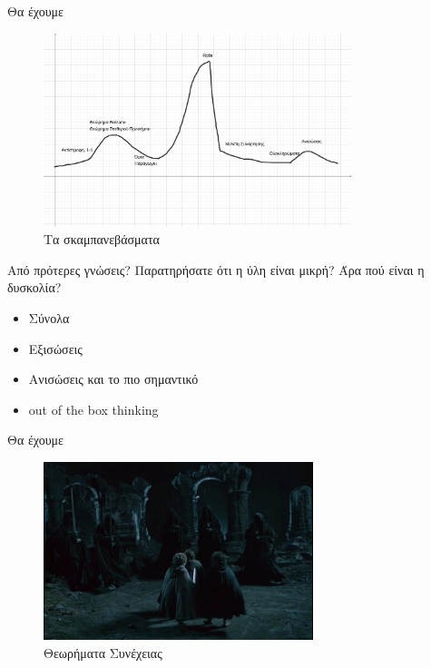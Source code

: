 \documentclass{presentation}
\begin{document}
\begin{frame}{Θα έχουμε}
      \begin{figure}
            \centering
            \includegraphics[width=0.8\textwidth]{"images/difficulty"}
            \caption{Τα σκαμπανεβάσματα}
      \end{figure}
\end{frame}

\begin{frame}{Από πρότερες γνώσεις?}
      Παρατηρήσατε ότι η ύλη είναι μικρή? Άρα πού είναι η δυσκολία?
      \begin{itemize}
            \item Σύνολα
            \item Εξισώσεις
            \item Ανισώσεις \pause και το πιο σημαντικό \pause
            \item out of the box thinking
      \end{itemize}
\end{frame}

\begin{frame}{Θα έχουμε}
      \begin{figure}
            \centering
            \includegraphics[width=0.7\textwidth]{"images/weathertop"}
            \caption{Θεωρήματα Συνέχειας}
      \end{figure}
\end{frame}
\end{document}
